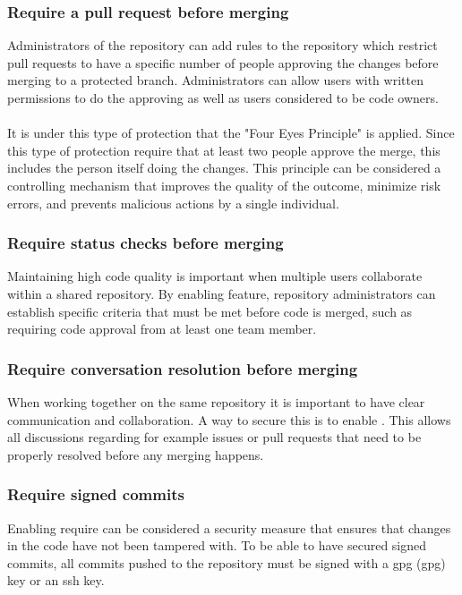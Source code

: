 \subsubsection{Require a pull request before merging}
Administrators of the repository can add rules to the repository which restrict pull requests to have a specific number of people approving the changes before merging to a protected branch. Administrators can allow users with written permissions to do the approving as well as users considered to be code owners. 
\\~\\
It is under this type of protection that the "Four Eyes Principle" is applied. Since this type of protection require that at least two people approve the merge, this includes the person itself doing the changes. This principle can be considered a controlling mechanism that improves the quality of the outcome, minimize risk errors, and prevents malicious actions by a single individual. 

\subsubsection{Require status checks before merging}
Maintaining high code quality is important when multiple users collaborate within a shared repository. 
By enabling  feature, repository administrators can establish specific criteria that must be met before code is merged, such as requiring code approval from at least one team member.

\subsubsection{Require conversation resolution before merging}
When working together on the same repository it is important to have clear communication and collaboration. A way to secure this is to enable . This allows all discussions regarding for example issues or pull requests that need to be properly resolved before any merging happens. 

\subsubsection{Require signed commits}
Enabling require  can be considered a security measure that ensures that changes in the code have not been tampered with. 
To be able to have secured signed commits, all commits pushed to the repository must be signed with a \acrlong{gpg} (\acrshort{gpg}) key or an \acrshort{ssh} key. 


